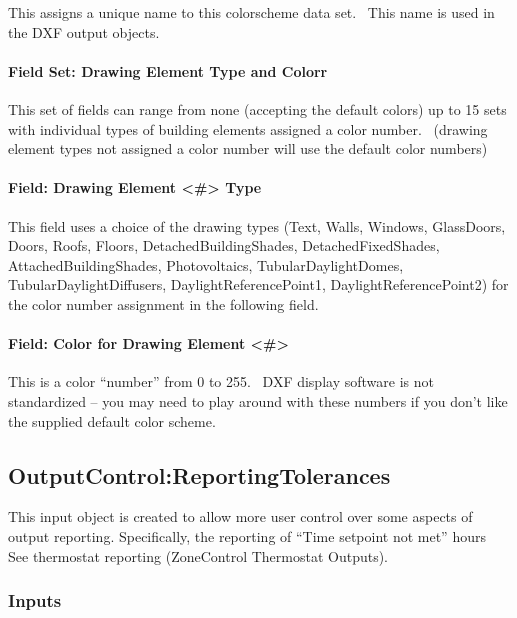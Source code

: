 This assigns a unique name to this colorscheme data set.~ This name is used in the DXF output objects.

\paragraph{Field Set: Drawing Element Type and Colorr}\label{field-set-drawing-element-type-and-colorr}

This set of fields can range from none (accepting the default colors) up to 15 sets with individual types of building elements assigned a color number.~ (drawing element types not assigned a color number will use the default color numbers)

\paragraph{Field: Drawing Element \textless{}\#\textgreater{} Type}\label{field-drawing-element-type}

This field uses a choice of the drawing types (Text, Walls, Windows, GlassDoors, Doors, Roofs, Floors, DetachedBuildingShades, DetachedFixedShades, AttachedBuildingShades, Photovoltaics, TubularDaylightDomes, TubularDaylightDiffusers, DaylightReferencePoint1, DaylightReferencePoint2) for the color number assignment in the following field.

\paragraph{Field: Color for Drawing Element \textless{}\#\textgreater{}}\label{field-color-for-drawing-element}

This is a color ``number'' from 0 to 255.~ DXF display software is not standardized -- you may need to play around with these numbers if you don't like the supplied default color scheme.

\subsection{OutputControl:ReportingTolerances}\label{outputcontrolreportingtolerances}

This input object is created to allow more user control over some aspects of output reporting. Specifically, the reporting of ``Time setpoint not met'' hours~ See thermostat reporting (ZoneControl Thermostat Outputs).

\subsubsection{Inputs}\label{inputs-7-021}

